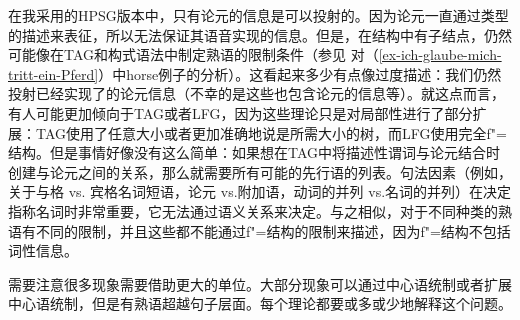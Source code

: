 在我采用的HPSG版本中，只有论元的信息是可以投射的。因为论元一直通过类型的描述来表征，所以无法保证其语音实现的信息。但是，在结构中有子结点，仍然可能像在TAG和构式语法中制定熟语的限制条件（参见 对（\ref{ex-ich-glaube-mich-tritt-ein-Pferd}）中horse例子的分析）。这看起来多少有点像过度描述：我们仍然投射已经实现了的论元信息（不幸的是这些也包含论元的信息等）。就这点而言，有人可能更加倾向于TAG或者LFG，因为这些理论只是对局部性进行了部分扩展：TAG使用了任意大小或者更加准确地说是所需大小的树，而LFG使用完全f"=结构。但是事情好像没有这么简单：如果想在TAG中将描述性谓词与论元结合时创建与论元之间的关系，那么就需要所有可能的先行语的列表。句法因素（例如，关于与格 vs. 宾格名词短语，论元 vs.附加语，动词的并列 vs.名词的并列）在决定指称名词时非常重要，它无法通过语义关系来决定。与之相似，对于不同种类的熟语有不同的限制，并且这些都不能通过f"=结构的限制来描述，因为f"=结构不包括词性信息。

需要注意很多现象需要借助更大的单位。大部分现象可以通过中心语统制或者扩展中心语统制，但是有熟语超越句子层面。每个理论都要或多或少地解释这个问题。



